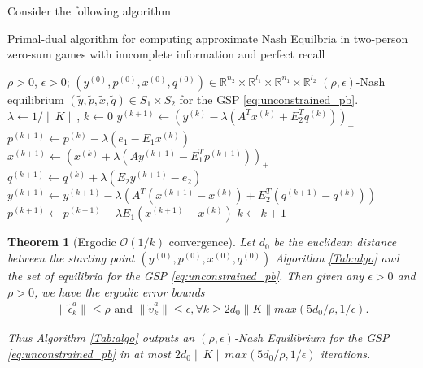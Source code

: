 \documentclass{article} %
\newtheorem{theorem}{Theorem} \newtheorem{lemma}[theorem]{Lemma}
\begin{document}
Consider the following algorithm
\begin{algorithm}
\caption{Primal-dual algorithm for computing approximate Nash
  Equilbria in two-person zero-sum games with imcomplete information
  and perfect recall}
\label{Tab:algo}
\begin{algorithmic}[1]
\Require $\rho >0$, $\epsilon > 0$; $(y^{(0)},p^{(0)},x^{(0)},q^{(0)})
\in \mathbb{R}^{n_2}
  \times \mathbb{R}^{l_1} \times \mathbb{R}^{n_1} \times
  \mathbb{R}^{l_2}$
\Ensure $(\rho, \epsilon)$-Nash equilibrium
$(\tilde{y},\tilde{p},\tilde{x},\tilde{q}) \in S_1 \times S_2$ for
the GSP \eqref{eq:unconstrained_pb}.
\State  $\lambda \leftarrow 1/\|K\|$,
$k \leftarrow 0$
\State $y^{(k + 1)} \leftarrow (y^{(k)} - \lambda (A^Tx^{(k)} +
E_2^Tq^{(k)}))_+$
\State  \hspace{.5em}$p^{(k+1)} \leftarrow p^{(k)} -
\lambda(e_1-E_1x^{(k)})$
\State $x^{(k + 1)} \leftarrow (x^{(k)} + \lambda (Ay^{(k+1)} -
E_1^Tp^{(k+1)}))_+$
\State  \hspace{.5em}$q^{(k+1)} \leftarrow q^{(k)} +
\lambda(E_2y^{(k+1)}-e_2)$
\State $y^{(k+1)} \leftarrow y^{(k+1)} - \lambda
(A^T(x^{(k+1)}-x^{(k)}) + E_2^T(q^{(k+1)}-q^{(k)}))$
\State $p^{(k+1)} \leftarrow p^{(k+1)} - \lambda E_1(x^{(k+1)}-x^{(k)})$
\State $k \leftarrow k + 1$
\EndWhile
\end{algorithmic}
\end{algorithm}

\begin{theorem}[Ergodic $\mathcal{O}(1/k)$ convergence]
Let $d_0$ be the euclidean distance between the starting point
$(y^{(0)},p^{(0)},x^{(0)},q^{(0)})$ Algorithm \ref{Tab:algo} and the
set of equilibria for the GSP \eqref{eq:unconstrained_pb}.
Then given any $\epsilon > 0$ and $\rho > 0$, we have the ergodic
error bounds
\begin{eqnarray}
\|\tilde{\epsilon}^{a}_k\| \le \rho\text{ and }\|\tilde{v}^{a}_k\| \le
\epsilon, \forall k \ge 2d_0\|K\|max(5d_0/\rho, 1/\epsilon).
\end{eqnarray}

Thus Algorithm \ref{Tab:algo} outputs an $(\rho,\epsilon)$-Nash
Equilibrium for the GSP \eqref{eq:unconstrained_pb}
in at most $2d_0\|K\|max(5d_0/\rho, 1/\epsilon)$ iterations.
\end{theorem}
\end{document}
